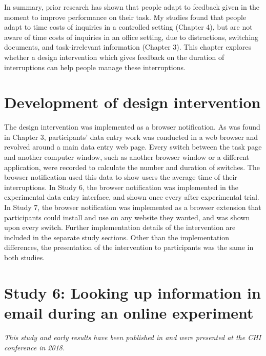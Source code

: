 In summary, prior research has shown that people adapt to feedback given in the moment to improve performance on their task. My studies found that people adapt to time costs of inquiries in a controlled setting (Chapter 4), but are not aware of time costs of inquiries in an office setting, due to distractions, switching documents, and task-irrelevant information (Chapter 3). This chapter explores whether a design intervention which gives feedback on the duration of interruptions can help people manage these interruptions.

\section{Development of design intervention}
The design intervention was implemented as a browser notification. As was found in Chapter 3, participants' data entry work was conducted in a web browser and revolved around a main data entry web page. Every switch between the task page and another computer window, such as another browser window or a different application, were recorded to calculate the number and duration of switches. The browser notification used this data to show users the average time of their interruptions. In Study 6, the browser notification was implemented in the experimental data entry interface, and shown once every after experimental trial. In Study 7, the browser notification was implemented as a browser extension that participants could install and use on any website they wanted, and was shown upon every switch. Further implementation details of the intervention are included in the separate study sections. Other than the implementation differences, the presentation of the intervention to participants was the same in both studies.

\section{Study 6: Looking up information in email during an online experiment}
\textit{This study and early results have been published in \citet{Borghouts2018a} and were presented at the CHI conference in 2018.}

